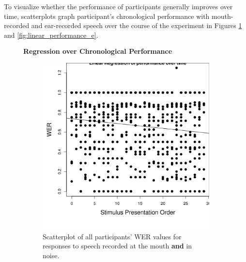 To visualize whether the performance of participants generally improves over time, scatterplots graph participant's chronological performance with mouth-recorded and ear-recorded speech over the course of the experiment in Figures \ref{fig:linear_performance_m} and \ref{fig:linear_performance_e}. 
%
\begin{figure}[ht]%
\centering
\textbf{Regression over Chronological Performance}
\begin{subfigure}{0.47\textwidth}

\includegraphics[width=\maxwidth]{figure/line_graph_chrono_m-1} 

\caption{Scatterplot of all participants' WER values for responses to speech recorded at the mouth \textbf{and} in noise.}
\label{fig:linear_performance_m}
\end{subfigure}
\begin{subfigure}{0.47\textwidth}%


\end{subfigure}
\end{figure}
